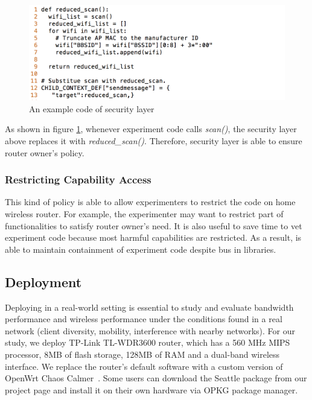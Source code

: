 \begin{figure}%
\centering
\includegraphics[width=0.8\columnwidth]{figure/example.png}
\caption{An example code of security layer}
\label{fig-examplecode}
\end{figure}

As shown in figure \ref{fig-examplecode}, whenever experiment code calls \textit{scan()}, the security layer above replaces it with \textit{reduced\_scan()}. Therefore, security layer is able to ensure router owner's policy.

\subsubsection{Restricting Capability Access}
This kind of policy is able to allow experimenters to restrict the code on home wireless router. For example, the experimenter may want to restrict part of functionalities to satisfy router owner's need. It is also useful to save time to vet experiment code because most harmful capabilities are restricted. As a result, \sysname is able to maintain containment of experiment code despite bus in libraries.
 
\subsection{Deployment}
Deploying \sysname in a real-world setting is essential to study and evaluate bandwidth performance and wireless performance under the conditions found in a real network (client diversity, mobility, interference with nearby networks). For our study, we deploy TP-Link TL-WDR3600 router, which has a 560 MHz MIPS processor, 8MB of flash storage, 128MB of RAM and a dual-band wireless interface. We replace the router's default software with a custom version of OpenWrt Chaos Calmer~\cite{openwrt}. Some users can download the Seattle package from our project page and install it on their own hardware via OPKG package manager.

